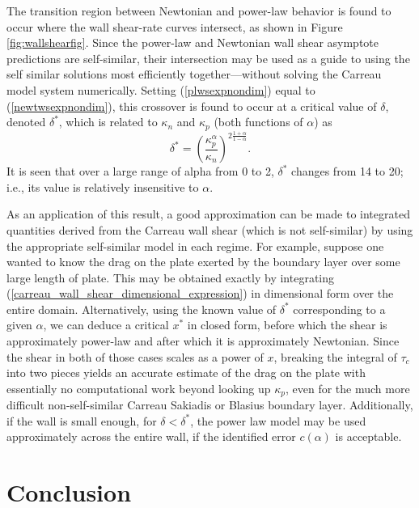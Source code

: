 \documentclass{article}
\begin{document}
The transition region between Newtonian and power-law behavior is found to occur where the wall shear-rate curves intersect, as shown in Figure \ref{fig:wallshearfig}. Since the power-law and Newtonian wall shear asymptote predictions are self-similar, their intersection may be used as a guide to using the self similar solutions most efficiently together---without solving the Carreau model system numerically. Setting (\ref{plwsexpnondim}) equal to (\ref{newtwsexpnondim}), this crossover is found to occur at a critical value of $\delta$, denoted $\delta^*$, which is related to $\kappa_n$ and $\kappa_p$ (both functions of $\alpha$) as \begin{equation} \delta^* = \left(\dfrac{\kappa_p^\alpha}{\kappa_n}\right)^{2\frac{1+\alpha}{1-\alpha}}.\end{equation} It is seen that over a large range of alpha from 0 to 2, $\delta^*$ changes from 14 to 20; i.e., its value is relatively insensitive to $\alpha$.  

As an application of this result, a good approximation can be made to integrated quantities derived from the Carreau wall shear (which is not self-similar) by using the appropriate self-similar model in each regime. For example, suppose one wanted to know the drag on the plate exerted by the boundary layer over some large length of plate. This may be obtained exactly by integrating (\ref{carreau_wall_shear_dimensional_expression}) in dimensional form over the entire domain. Alternatively, using the known value of $\delta^*$ corresponding to a given $\alpha$, we can deduce a critical $x^*$ in closed form, before which the shear is approximately power-law and after which it is approximately Newtonian. Since the shear in both of those cases scales as a power of $x$, breaking the integral of $\tau_c$ into two pieces yields an accurate estimate of the drag on the plate with essentially no computational work beyond looking up $\kappa_p$, even for the much more difficult non-self-similar Carreau Sakiadis or Blasius boundary layer. Additionally, if the wall is small enough, for $\delta<\delta^*$, the power law model may be used approximately across the entire wall, if the identified error $c(\alpha)$ is acceptable.



\section{Conclusion}
\end{document}
